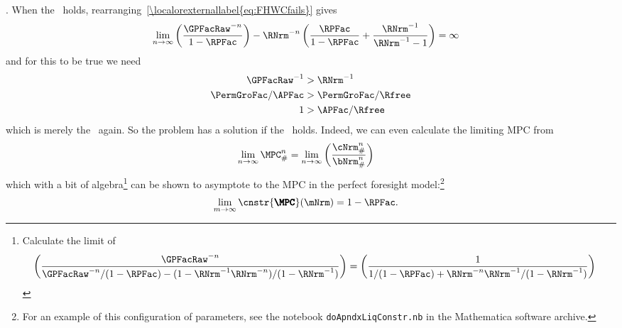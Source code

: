 \documentclass[\econtexRoot/BufferStockTheory]{subfiles}
\begin{document}
.  When the \RIC~holds, rearranging~\eqref{\localorexternallabel{eq:FHWCfails}} gives
\begin{eqnarray*}
  \lim_{n \rightarrow \infty} \left(\frac{\GPFacRaw^{-n}}{1-\RPFac}\right)-\RNrm^{-n}\left(\frac{\RPFac}{1-\RPFac}+\frac{\RNrm^{-1}}{\RNrm^{-1}-1}\right)  & = \infty
\end{eqnarray*}
and for this to be true we need
\begin{eqnarray*}
  \GPFacRaw^{-1}  & > \RNrm^{-1}
  \\ \PermGroFac/\APFac  & > \PermGroFac/\Rfree
  \\ 1  & > \APFac/\Rfree
\end{eqnarray*}
which is merely the \RIC~again.  So the problem has a solution if the \RIC~holds.  Indeed,
we can even calculate the limiting MPC from
\begin{equation}\begin{gathered}\begin{aligned}
  \lim_{n \rightarrow \infty} \MPC^{n}_{\#}  & = \lim_{n \rightarrow \infty} \left(\frac{\cNrm_{\#}^{n}}{\bNrm_{\#}^{n}}\right) \label{eq:MPCConstrLim}
\end{aligned}\end{gathered}\end{equation}
which with a bit of algebra\footnote{
  Calculate the limit of
  \begin{equation}\begin{gathered}\begin{aligned}
    \left(\frac{\GPFacRaw^{-n}}{\GPFacRaw^{-n}/(1-\RPFac) - (1-\RNrm^{-1}\RNrm^{-n})/(1-\RNrm^{-1})}\right)  & = \left(\frac{1}{1/(1-\RPFac) + \RNrm^{-n}\RNrm^{-1}/(1-\RNrm^{-1})}\right)
  \end{aligned}\end{gathered}\end{equation}} can be shown to asymptote to the MPC in the perfect foresight model:\footnote{For an example of this configuration of parameters, see the notebook \texttt{doApndxLiqConstr.nb} in the Mathematica software  archive.}
\begin{equation}\begin{gathered}\begin{aligned}
  \lim_{m \rightarrow \infty} \cnstr{\pmb{\MPC}}(\mNrm)  & = 1-\RPFac.
\end{aligned}\end{gathered}\end{equation}
\end{document}

